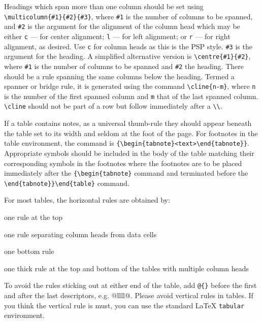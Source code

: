 Headings which span more than one column should be set using
\verb|\multicolumn{#1}{#2}{#3}|, where \verb|#1| is the number of
columns to be spanned, and \verb|#2| is the argument for the
alignment of the column head which may be either \verb|c| --- for
center alignment; \verb|l| --- for left alignment; or \verb|r| ---
for right alignment, as desired. Use \verb|c| for column heads as
this is the PSP style. \verb|#3| is the argument for the heading. A
simplified alternative version is \verb|\centre{#1}{#2}|, where
\verb|#1| is the number of columns to be spanned and \verb|#2| the
heading. There should be a rule spanning the same columns below the
heading. Termed a spanner or bridge rule, it is generated using the
command \verb|\cline{n-m}|, where \verb|n| is the number of the
first spanned column and \verb|m| that of the last spanned column.
\verb|\cline| should not be part of a row but follow immediately
after a \verb|\\|.

If a table contains notes, as a
universal thumb-rule they should appear beneath the table set to its
width and seldom at the foot of the page. For footnotes in the
table environment, the command is
\verb|{\begin{tabnote}<text>\end{tabnote}}|. Appropriate symbols
should be included in the body of the table matching their
corresponding symbols in the footnotes where the footnotes are to be
placed immediately after the \verb|{\begin{tabnote}| command and
terminated before the \verb|\end{tabnote}}\end{table}| command.

For most tables, the horizontal rules are obtained by:

\begin{description}
\item[toprule] one rule at the top
\item[colrule] one rule separating column heads from data cells
\item[botrule] one bottom rule
\item[Hline] one thick rule at the top and bottom of the tables with multiple column heads
\end{description}

To avoid the rules sticking out at either end of the table, add
\verb|@{}| before the first and after the last descriptors, e.g.
{@{}llll@{}}. Please avoid vertical rules in tables. If you
think the vertical rule is must, you can use the standard \LaTeX{}
\verb|tabular| environment.

